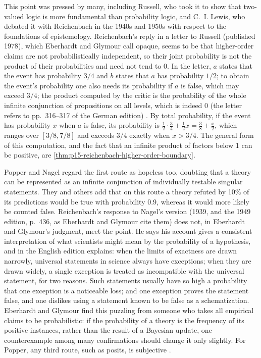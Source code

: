 This point was pressed by many, including Russell, who took it to show
that two-valued logic is more fundamental than probability logic, and
C.~I. Lewis, who debated it with Reichenbach in the 1940s and 1950s with
respect to the foundations of epistemology. Reichenbach's reply in a
letter to Russell (published 1978), which Eberhardt and Glymour call opaque, seems
to be that higher-order claims are not probabilistically independent, so
their joint probability is not the product of their probabilities and
need not tend to 0. In the letter, \(a\) states that the event has
probability \(3/4\) and \(b\) states that \(a\) has probability \(1/2\);
to obtain the event's probability one also needs its probability if \(a\)
is false, which may exceed \(3/4\); the product computed by the critic is
the probability of the whole infinite conjunction of propositions on all
levels, which is indeed 0 (the letter refers to pp.~316--317 of the
German edition) \cite[p.~378]{EberhardtGlymour2011ReichenbachReading}.
By total probability, if the event has probability \(x\) when \(a\) is
false, its probability is \(\tfrac12\cdot\tfrac34+\tfrac12x=\tfrac38+\tfrac x2\),
which ranges over \([3/8,7/8]\) and exceeds \(3/4\) exactly when \(x>3/4\).
The general form of this computation, and the fact that an infinite
product of factors below 1 can be positive, are
\cref{thm:p15-reichenbach-higher-order-boundary}.

Popper and Nagel regard the first route as hopeless too, doubting that a
theory can be represented as an infinite conjunction of individually
testable singular statements. They and others add that on this route a
theory refuted by 10\% of its predictions would be true with probability
0.9, whereas it would more likely be counted false. Reichenbach's
response to Nagel's version (1939, and the 1949 edition, p.~436, as Eberhardt and Glymour cite them) does not, in Eberhardt and Glymour's judgment, meet the point.
He says his account gives a consistent interpretation of what scientists
might mean by the probability of a hypothesis, and in the English
edition explains: when the limits of exactness are drawn narrowly,
universal statements in science always have exceptions; when they are
drawn widely, a single exception is treated as incompatible with the
universal statement, for two reasons. Such statements usually have so
high a probability that one exception is a noticeable loss; and one
exception proves the statement false, and one dislikes using a
statement known to be false as a schematization. Eberhardt and Glymour find this
puzzling from someone who takes all empirical claims to be
probabilistic: if the probability of a theory is the frequency of its
positive instances, rather than the result of a Bayesian update, one
counterexample among many confirmations should change it only slightly.
For Popper, any third route, such as posits, is subjective
\cite[pp.~378--379]{EberhardtGlymour2011ReichenbachReading}.

